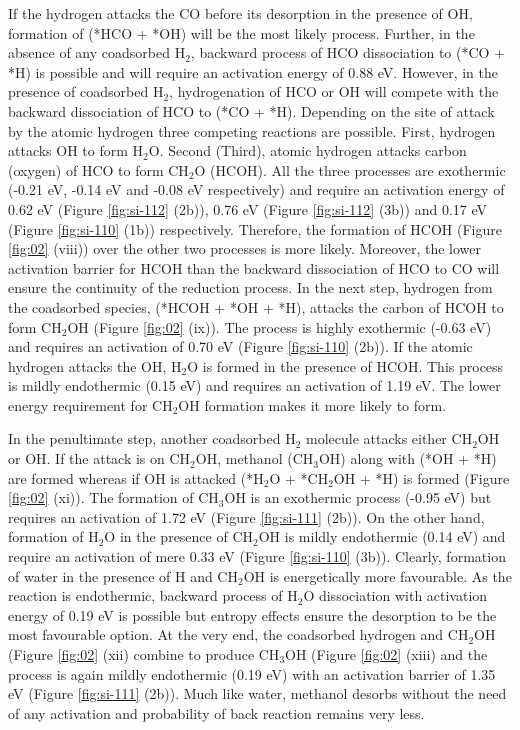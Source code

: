 If the hydrogen attacks the CO before its desorption in the presence of OH, formation of (*HCO + *OH) will be the most likely process. Further, in the absence of any coadsorbed H$_2$, backward process of HCO dissociation to (*CO + *H) is possible and will require an activation energy of 0.88 eV. However, in the presence of coadsorbed H$_2$, hydrogenation of HCO or OH will compete with the backward dissociation of HCO to (*CO + *H). Depending on the site of attack by the atomic hydrogen three competing reactions are possible. First, hydrogen attacks OH to form H$_2$O. Second (Third), atomic hydrogen attacks carbon (oxygen) of HCO to form CH$_2$O (HCOH). All the three processes are exothermic (-0.21 eV, -0.14 eV and -0.08 eV respectively) and require an activation energy of 0.62 eV (Figure \ref{fig:si-112} (2b)), 0.76 eV (Figure \ref{fig:si-112} (3b)) and 0.17 eV (Figure \ref{fig:si-110} (1b)) respectively. Therefore, the formation of HCOH (Figure \ref{fig:02} (viii)) over the other two processes is more likely. Moreover, the lower activation barrier for HCOH than the backward dissociation of HCO to CO will ensure the continuity of the reduction process. In the next step, hydrogen from the coadsorbed species, (*HCOH + *OH + *H), attacks the carbon of HCOH to form CH$_2$OH (Figure \ref{fig:02} (ix)). The process is highly exothermic (-0.63 eV) and requires an activation of 0.70 eV (Figure \ref{fig:si-110} (2b)). If the atomic hydrogen attacks the OH, H$_2$O is formed in the presence of HCOH. This process is mildly endothermic (0.15 eV) and requires an activation of 1.19 eV. The lower energy requirement for CH$_2$OH formation makes it more likely to form.  

In the penultimate step, another coadsorbed H$_2$ molecule attacks either CH$_2$OH or OH. If the attack is on CH$_2$OH, methanol (CH$_3$OH) along with (*OH + *H) are formed whereas if OH is attacked (*H$_2$O + *CH$_2$OH + *H) is formed (Figure \ref{fig:02} (xi)). The formation of CH$_3$OH is an exothermic process (-0.95 eV) but requires an activation of 1.72 eV (Figure \ref{fig:si-111} (2b)). On the other hand, formation of H$_2$O in the presence of CH$_2$OH is mildly endothermic (0.14 eV) and require an activation of mere 0.33 eV (Figure \ref{fig:si-110} (3b)). Clearly, formation of water in the presence of H and CH$_2$OH is energetically more favourable. As the reaction is endothermic, backward process of H$_2$O dissociation with activation energy of 0.19 eV is possible but entropy effects ensure the desorption to be the most favourable option. At the very end, the coadsorbed hydrogen and CH$_2$OH (Figure \ref{fig:02} (xii) combine to produce CH$_3$OH (Figure \ref{fig:02} (xiii) and the process is again mildly endothermic (0.19 eV) with an activation barrier of 1.35 eV (Figure \ref{fig:si-111} (2b)). Much like water, methanol desorbs without the need of any activation and probability of back reaction remains very less. 
 

